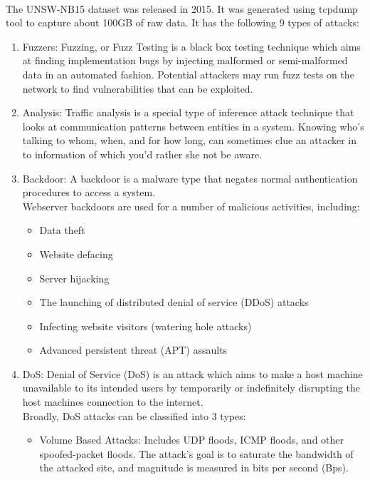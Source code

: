 \paragraph{}
The UNSW-NB15 dataset was released in 2015. It was generated using tcpdump tool to capture about 100GB of raw data. It has the following 9 types of attacks:
\begin{enumerate}
    \item Fuzzers: Fuzzing, or Fuzz Testing is a black box testing technique which aims at finding implementation bugs by injecting malformed or semi-malformed data in an automated fashion. Potential attackers may run fuzz tests on the network to find vulnerabilities that can be exploited.
    \item Analysis: Traffic analysis is a special type of inference attack technique that looks at communication patterns between entities in a system. Knowing who's talking to whom, when, and for how long, can sometimes clue an attacker in to information of which you'd rather she not be aware.
    \item Backdoor: A backdoor is a malware type that negates normal authentication procedures to access a system.\\
    Webserver backdoors are used for a number of malicious activities, including:
    \begin{itemize}
        \item Data theft
        \item Website defacing
        \item Server hijacking
        \item The launching of distributed denial of service (DDoS) attacks
        \item Infecting website visitors (watering hole attacks)
        \item Advanced persistent threat (APT) assaults
    \end{itemize}
    \item DoS: Denial of Service (DoS) is an attack which aims to make a host machine unavailable to its intended users by temporarily or indefinitely disrupting the host machines connection to the internet. \\
    Broadly, DoS attacks can be classified into 3 types:
    \begin{itemize}
        \item Volume Based Attacks: Includes UDP floods, ICMP floods, and other spoofed-packet floods. The attack’s goal is to saturate the bandwidth of the attacked site, and magnitude is measured in bits per second (Bps).

\end{itemize}
\end{enumerate}
